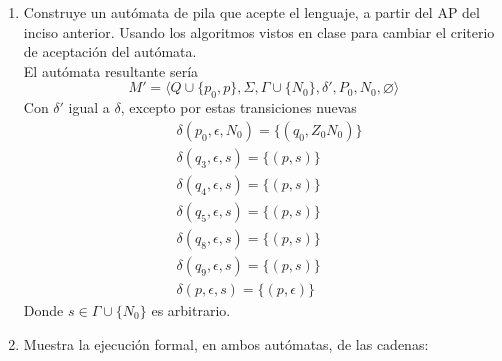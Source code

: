 \documentclass{article}
\begin{document}
\begin{enumerate}
{\begin{enumerate}
{	        \begin{itemize}
	        	\item {
	        		$Q = \{q_0\} \cup Q_1 \cup Q_2$
	        	}
	        	
	        	\item {
	        		$\Sigma = \{a, b, c\}$
	        	}
	        	\item {
	        		$\Gamma = \{A, B, Z_0\}$
	        	}
	        	\item {
	        		\begin{align*}
						\delta (q_0, \epsilon, Z_0) &= \{(q_0, Z_0), (q_6, Z_0)\} \\
						\delta (p, s, \gamma) &= 
						\begin{cases}
							&\delta_1(p, s, \gamma) \text{ si } p \in Q_1 \\
							&\delta_2(p, s, \gamma) \text{ si } p \in Q_2 \\
						\end{cases}
					\end{align*}
	        	}
	        	\item {
	        		$q_0$ es el estado inicial.
	        	}
	        	\item {
	        		$Z_0$ es el símbolo al fondo de la pila.
	        	}
	        	\item {
	        		$F = F_1 \cup F_2$
	        	}
	        \end{itemize}
	        }
        	\item{
            Construye un autómata de pila que acepte el lenguaje, a partir del
            AP del inciso anterior. Usando los algoritmos vistos en clase para
            cambiar el criterio de aceptación del autómata.\\
            El autómata resultante sería 
            \[M' = \langle Q \cup \{p_0, p\} , \Sigma, \Gamma \cup \{N_0\} , \delta', P_0 , N_0, \varnothing \rangle\]
            Con $\delta'$ igual a $\delta$, excepto por estas transiciones nuevas
            \begin{align*}
            	&\delta(p_0, \epsilon, N_0) = \{(q_0, Z_0N_0)\}\\
				&\delta(q_3, \epsilon, s) = \{(p, s)\} \\
				&\delta(q_4, \epsilon, s) = \{(p, s)\} \\
				&\delta(q_5, \epsilon, s) = \{(p, s)\} \\
				&\delta(q_8, \epsilon, s) = \{(p, s)\} \\
				&\delta(q_9, \epsilon, s) = \{(p, s)\} \\
            	&\delta(p, \epsilon, s) = \{(p,\epsilon)\}
			\end{align*}
			Donde $s\in \Gamma \cup \{N_0\}$ es arbitrario.
           }   	
        	\item{
        	Muestra la ejecución formal, en ambos autómatas, de las cadenas:
        	
}
\end{enumerate}}
\end{enumerate}
\end{document}
